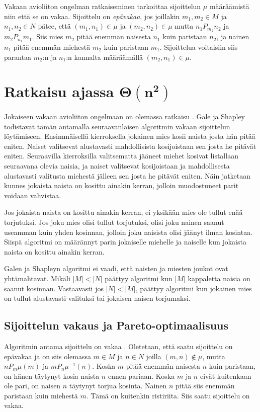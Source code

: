 \documentclass[gradu, twoside]{tktltiki}
\begin{document}
Vakaan avioliiton ongelman ratkaiseminen tarkoittaa sijoittelun $\mu$
määräämistä niin että se on vakaa. Sijoittelu on \emph{epävakaa}, jos
joillakin $m_1, m_2 \in M$ ja $n_1, n_2 \in N$ pätee, että $(m_1, n_1)
\in \mu$ ja $(m_2, n_2) \in \mu$ mutta $n_1P_{m_2}n_2$ ja
$m_2P_{n_1}m_1$. Siis mies $m_2$ pitää enemmän naisesta $n_1$ kuin
paristaan $n_2$, ja nainen $n_1$ pitää enemmän miehestä $m_2$ kuin
paristaan $m_1$. Sijoittelua voitaisiin siis parantaa $m_2$:n ja
$n_1$:n kannalta määräämällä $(m_2, n_1) \in \mu$.

\section{Ratkaisu ajassa $\boldsymbol{\Theta(n^2)}$}

Jokaiseen vakaan avioliiton ongelmaan on olemassa ratkaisu
\cite{galeshapley62}. Gale ja Shapley todistavat tämän antamalla
seuraavanlaisen algoritmin vakaan sijoittelun löytämiseen.
Ensimmäisellä kierroksella jokainen mies kosii naista josta hän pitää
eniten. Naiset valitsevat alustavasti mahdollisista kosijoistaan sen
josta he pitävät eniten. Seuraavilla kierroksilla valitsematta jääneet
miehet kosivat listallaan seuraavana olevia naisia, ja naiset
valitsevat kosijoistaan ja mahdollisesta alustavasti valitusta
miehestä jälleen sen josta he pitävät eniten. Näin jatketaan kunnes
jokaista naista on kosittu ainakin kerran, jolloin muodostuneet parit
voidaan vahvistaa.

Jos jokaista naista on kosittu ainakin kerran, ei yksikään mies ole
tullut enää torjutuksi. Jos joku mies olisi tullut torjutuksi, olisi
joku nainen saanut useamman kuin yhden kosinnan, jolloin joku naisista
olisi jäänyt ilman kosintaa. Siispä algoritmi on määrännyt parin
jokaiselle miehelle ja naiselle kun jokaista naista on kosittu ainakin
kerran.

Galen ja Shapleyn algoritmi ei vaadi, että naisten ja miesten joukot
ovat yhtämahtavat. Mikäli $|M| < |N|$ päättyy algoritmi kun $|M|$
kappaletta naisia on saanut kosinnan. Vastaavasti jos $|N| < |M|$,
päättyy algoritmi kun jokainen mies on tullut alustavasti valituksi
tai jokaisen naisen torjumaksi. \cite{galeshapley62}

\subsection{Sijoittelun vakaus ja Pareto-optimaalisuus}

Algoritmin antama sijoittelu on vakaa \cite{galeshapley62}. Oletetaan,
että saatu sijoittelu on epävakaa ja on siis olemassa $m \in M$ ja $n
\in N$ joilla $(m, n) \notin \mu$, mutta $nP_m\mu(m)$ ja
$mP_n\mu^{-1}(n)$. Koska $m$ pitää enemmän naisesta $n$ kuin
paristaan, on hänen täytynyt kosia naista $n$ ennen pariaan. Koska $m$
ja $n$ eivät kuitenkaan ole pari, on naisen $n$ täytynyt torjua
kosinta. Nainen $n$ pitää siis enemmän paristaan kuin miehestä $m$.
Tämä on kuitenkin ristiriita. Siis saatu sijoittelu on vakaa.
\end{document}
